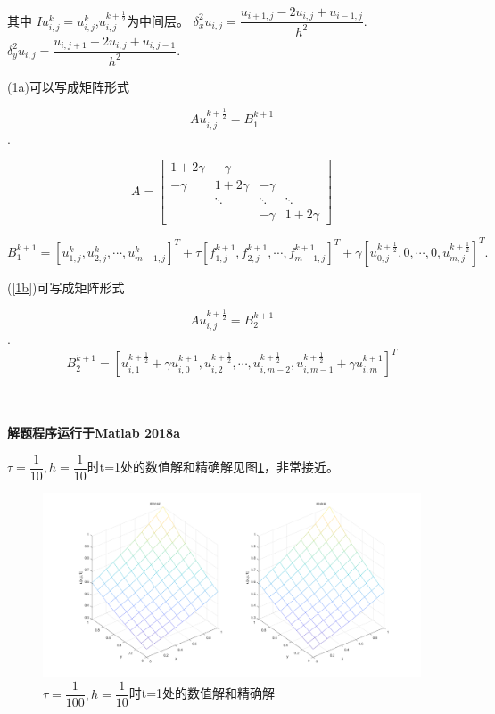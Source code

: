 \documentclass[withoutpreface,bwprint]{cumcmthesis} %
\begin{document}
其中
$Iu_{i,j}^k=u_{i,j}^k$,$u_{i,j}^{k+\frac{1}{2}}$为中间层。
$\delta_x^2u_{i,j}=\dfrac{u_{i+1,j}-2u_{i,j}+u_{i-1,j}}{h^2}.$
$\delta_y^2u_{i,j}=\dfrac{u_{i,j+1}-2u_{i,j}+u_{i,j-1}}{h^2}.$


(1a)可以写成矩阵形式

$$A u_{i,j}^{k+\frac{1}{2}}=B_1^{k+1}$$.

$$
A=
\begin{bmatrix}
	1+2\gamma & -\gamma \\
	-\gamma & 1+2\gamma & -\gamma \\
	& \ddots & \ddots & \ddots \\
	& & 	-\gamma & 1+2\gamma
\end{bmatrix}
$$

$$
B_1^{k+1}=[u_{1,j}^k,u_{2,j}^k,\cdots,u_{m-1,j}^k]^T+\tau [f_{1,j}^{k+1},f_{2,j}^{k+1},\cdots,f_{m-1,j}^{k+1}]^T+ \gamma[u_{0,j}^{k+\frac{1}{2}},0,\cdots,0,u_{m,j}^{k+\frac{1}{2}}]^T.
$$

(\ref{1b})可写成矩阵形式

$$A u_{i,j}^{k+\frac{1}{2}}=B_2^{k+1}$$.
$$
B_2^{k+1}=[u_{i,1}^{k+\frac{1}{2}}+\gamma u_{i,0}^{k+1},u_{i,2}^{k+\frac{1}{2}},\cdots,u_{i,m-2}^{k+\frac{1}{2}},u_{i,m-1}^{k+\frac{1}{2}}+\gamma u_{i,m}^{k+1}]^T
$$

~\\
~\\




\textbf{解题程序运行于Matlab 2018a}

$\tau=\dfrac{1}{10},h=\dfrac{1}{10}$时t=1处的数值解和精确解见图\ref{fig:f1}，非常接近。
\begin{figure}
	\centering
	\includegraphics[width=1\linewidth]{figures/f1}
	\caption{$\tau=\dfrac{1}{100},h=\dfrac{1}{10}$时t=1处的数值解和精确解}
	\label{fig:f1}
\end{figure}
\end{document}
